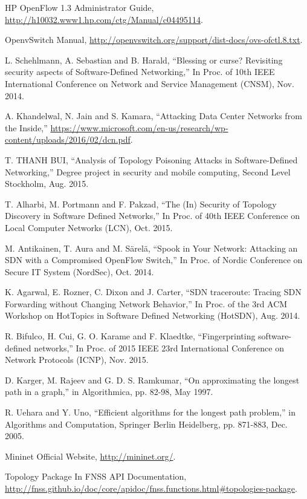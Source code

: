 \begin{thebibliography}{1}
HP OpenFlow 1.3 Administrator Guide, \url{http://h10032.www1.hp.com/ctg/Manual/c04495114}.

OpenvSwitch Manual, \url{http://openvswitch.org/support/dist-docs/ovs-ofctl.8.txt}.

L. Schehlmann, A. Sebastian and B. Harald, 
``Blessing or curse? Revisiting security aspects of Software-Defined Networking,'' In Proc. of 10th IEEE International Conference on Network and Service Management (CNSM), Nov. 2014.

A. Khandelwal, N. Jain and S. Kamara,
``Attacking Data Center Networks from the Inside,'' \url{https://www.microsoft.com/en-us/research/wp-content/uploads/2016/02/dcn.pdf}.

T. THANH BUI,
``Analysis of Topology Poisoning Attacks in Software-Defined Networking,'' Degree project in security and mobile computing, Second Level Stockholm, Aug. 2015.

T. Alharbi, M. Portmann and F. Pakzad,
``The (In) Security of Topology Discovery in Software Defined Networks,'' In Proc. of 40th IEEE Conference on Local Computer Networks (LCN), Oct. 2015.
 
M. Antikainen, T. Aura and M. Särelä,
``Spook in Your Network: Attacking an SDN with a Compromised OpenFlow Switch,'' In Proc. of Nordic Conference on Secure IT System (NordSec), Oct. 2014.

K. Agarwal, E. Rozner, C. Dixon and J. Carter,
``SDN traceroute: Tracing SDN Forwarding without Changing Network Behavior,'' In Proc. of the 3rd ACM Workshop on HotTopics in Software Defined Networking (HotSDN), Aug. 2014.

R. Bifulco, H. Cui, G. O. Karame and F. Klaedtke,
``Fingerprinting software-defined networks,'' In Proc. of 2015 IEEE 23rd International Conference on Network Protocols (ICNP), Nov. 2015.

D. Karger, M. Rajeev and G. D. S. Ramkumar,
``On approximating the longest path in a graph,'' in Algorithmica, pp. 82-98, May 1997.

R. Uehara and Y. Uno,
``Efficient algorithms for the longest path problem,'' in Algorithms and Computation, Springer Berlin Heidelberg, pp. 871-883, Dec. 2005.


Mininet Official Website, \url{http://mininet.org/}.

Topology Package In FNSS API Documentation, \url{http://fnss.github.io/doc/core/apidoc/fnss.functions.html#topologies-package}.


\end{thebibliography}
